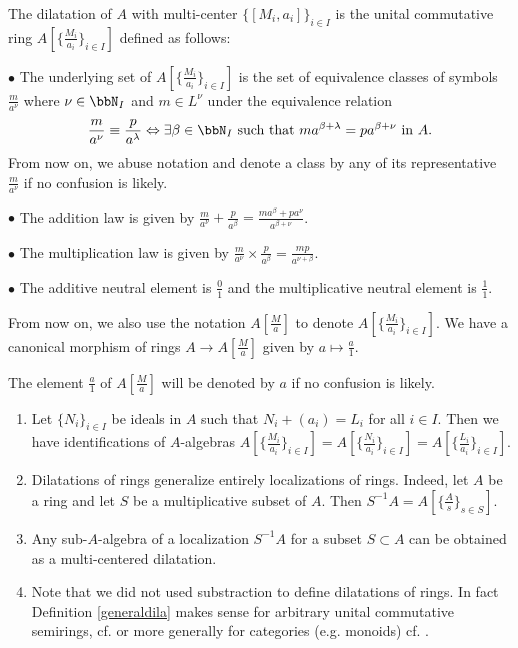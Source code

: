 \documentclass[10pt]{alggeom}
\theoremstyle{definition}
\numberwithin{equation}{section}
\begin{document}
\depr[{\cite{Ma23d}}] \label{generaldila} The dilatation of $A$ with multi-center $\{[M_i , a_i] \}_{i \in I}$ is the unital commutative ring $A[\big\{ \frac{M_i}{a_i}\big\}_{i \in I}]$ defined as follows:

$\bullet$  The underlying set of $A[\big\{ \frac{M_i}{a_i}\big\}_{i \in I}]$ is the set of equivalence classes of symbols $\frac{m}{a^{\nu}} $ where $ \nu \in \bbN _I$ and $m \in L^{\nu}$ under the equivalence relation 
\[ \frac{m}{a^\nu} \equiv \frac{p}{a^{\lambda}} \Leftrightarrow \exists \beta \in \bbN _I \text{ such that } ma^{\beta + \lambda }= p a^{\beta + \nu } \text{ in } A.\] From now on, we abuse notation and denote a class by any of its representative $\frac{m}{a^{\nu}}$ if no confusion is likely.


$\bullet$ The addition law is given by $\frac{m}{a^{\nu}}+ \frac{p}{a^{\beta}}= \frac{m a^{\beta } + p a^{\nu}}{a^{\beta + \nu}}$.

$\bullet$ The multiplication law is given by $\frac{m}{a^{\nu}}\times  \frac{p}{a^{\beta}} = \frac{ mp}{a^{\nu + \beta }}$.

$\bullet$ The additive neutral element is $\frac{0}{1}$ and the multiplicative neutral element is $\frac{1}{1}$.
\begin{flushleft}
From now on, we also use the notation $A[\frac{M}{a}]$ to denote $A[\big\{ \frac{M_i}{a_i}\big\}_{i \in I}]$.
We have a canonical morphism of rings $A \to A[\frac{M}{a}]$ given by $a \mapsto \frac{a}{1}$.
\end{flushleft}
\xdepr

The element $\frac{a}{1}$  of $ A[\frac{M}{a}]$ will be denoted by $a$ if no confusion is likely.



\fact[{\cite{Ma23d}}] \label{remdilaring} \begin{enumerate}  \item  Let $\{N_i\}_{i \in I}$ be ideals in $A$ such that  $ N_i +(a_i) = L_i$ for all $i \in I$.  Then we have identifications of $A$-algebras $A[\big\{ \frac{M_i}{a_i}\big\}_{i \in I}]= A[\big\{ \frac{N_i}{a_i}\big\}_{i \in I}]= A[\big\{ \frac{L_i}{a_i}\big\}_{i \in I}].$
\item  Dilatations of rings generalize entirely localizations of rings. Indeed, let $A$ be a ring and let $S$ be a multiplicative subset of $A$.  Then $S^{-1} A = A[\big\{ \frac{A}{s}\big\}_{s \in S}]$. 
\item Any sub-$A$-algebra of a localization $S^{-1} A$ for a subset $S \subset A$ can be obtained as a multi-centered dilatation. 
\item  Note that we did not used substraction to define dilatations of rings. In fact Definition \ref{generaldila} makes sense for arbitrary unital commutative semirings, cf. \cite[§2]{Ma23d} or more generally for categories (e.g. monoids) cf. \cite{Ma23c}. \end{enumerate}
\xfact
\end{document}
